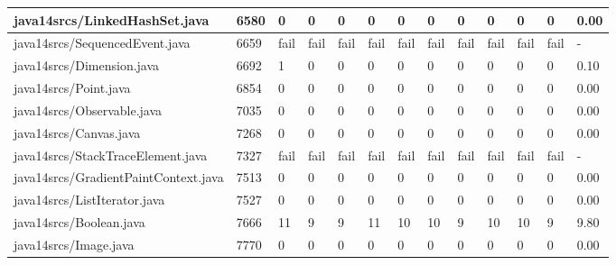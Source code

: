 \begin{tabular}{|l|l|l|l|l|l|l|l|l|l|l|l|l|}
\hline
java14srcs/LinkedHashSet.java                      & 6580        & 0         & 0         & 0         & 0         & 0         & 0         & 0         & 0         & 0         & 0         & 0.00      \\
\hline
java14srcs/SequencedEvent.java                     & 6659        & fail      & fail      & fail      & fail      & fail      & fail      & fail      & fail      & fail      & fail      & -         \\
\hline
java14srcs/Dimension.java                          & 6692        & 1         & 0         & 0         & 0         & 0         & 0         & 0         & 0         & 0         & 0         & 0.10      \\
\hline
java14srcs/Point.java                              & 6854        & 0         & 0         & 0         & 0         & 0         & 0         & 0         & 0         & 0         & 0         & 0.00      \\
\hline
java14srcs/Observable.java                         & 7035        & 0         & 0         & 0         & 0         & 0         & 0         & 0         & 0         & 0         & 0         & 0.00      \\
\hline
java14srcs/Canvas.java                             & 7268        & 0         & 0         & 0         & 0         & 0         & 0         & 0         & 0         & 0         & 0         & 0.00      \\
\hline
java14srcs/StackTraceElement.java                  & 7327        & fail      & fail      & fail      & fail      & fail      & fail      & fail      & fail      & fail      & fail      & -         \\
\hline
java14srcs/GradientPaintContext.java               & 7513        & 0         & 0         & 0         & 0         & 0         & 0         & 0         & 0         & 0         & 0         & 0.00      \\
\hline
java14srcs/ListIterator.java                       & 7527        & 0         & 0         & 0         & 0         & 0         & 0         & 0         & 0         & 0         & 0         & 0.00      \\
\hline
java14srcs/Boolean.java                            & 7666        & 11        & 9         & 9         & 11        & 10        & 10        & 9         & 10        & 10        & 9         & 9.80      \\
\hline
java14srcs/Image.java                              & 7770        & 0         & 0         & 0         & 0         & 0         & 0         & 0         & 0         & 0         & 0         & 0.00      \\

\end{tabular}

